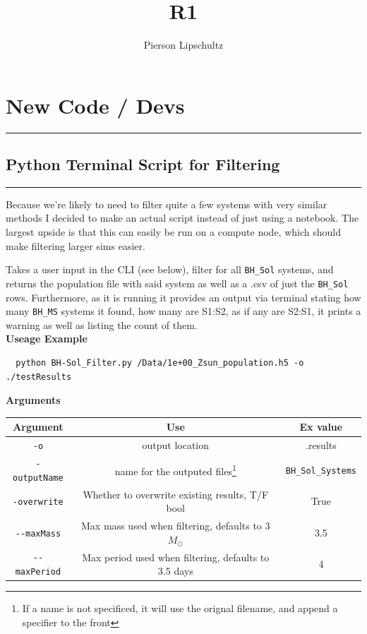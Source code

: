 \documentclass{article}
\title{R1}
\author{Pierson Lipschultz}
\theoremstyle{mytheoremstyle}
\theoremstyle{mytheoremstyle}
\theoremstyle{myproblemstyle}
\theoremstyle{myproblemstyle}
\begin{document}
    \pagestyle{fancy}

    \fancyhf{}
    \fancyfoot[L]{\nouppercase{\leftmark}} %
    \fancyfoot[R]{\thepage}%

    \renewcommand{\headrulewidth}{0pt}
    \renewcommand{\footrulewidth}{0.4pt}
    \renewcommand{\sectionmark}[1]{\markboth{#1}{}}

    \maketitle

\section{New Code / Devs}
\hrule
\vspace{.5cm}

\subsection{Python Terminal Script for Filtering}
\hrule
\vspace{.5cm}
Because we're likely to need to filter quite a few systems with very similar methods I decided to make an actual script instead of just using a notebook. The largest upside is that this can easily be run on a compute node, which should make filtering larger sims easier.

Takes a user input in the CLI (see below), filter for all \verb|BH_Sol| systems, and returns the population file with said system as well as a .csv of just the \verb|BH_Sol| rows. Furthermore, as it is running it provides an output via terminal stating how many \verb|BH_MS| systems it found, how many are S1:S2, as if any are S2:S1, it prints a warning as well as listing the count of them.\\

\textbf{Useage Example}
\begin{verbatim}
  python BH-Sol_Filter.py /Data/1e+00_Zsun_population.h5 -o ./testResults
\end{verbatim}

\textbf{Arguments}
\begin{center}
\begin{tabular}{|c|c|c|}
\hline
 Argument & Use & Ex value \\
 \hline
 \verb|-o| & output location  & .results\\
 \verb|-outputName| & name for the outputed files\footnote{If a name is not specificed, it will use the orignal filename, and append a specifier to the front}  & \verb|BH_Sol_Systems|\\
 \verb|-overwrite| & Whether to overwrite existing results, T/F bool& True\\
 \verb|--maxMass| & Max mass used when filtering, defaults to 3\(M_\odot\)& 3.5\\
 \verb|--maxPeriod| & Max period used when filtering, defaults to 3.5 days & 4\\
\hline
\end{tabular}
\end{center}
\end{document}

